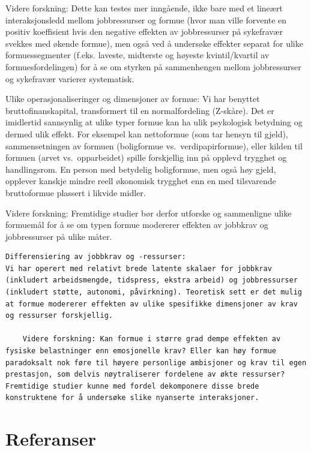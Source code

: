 \documentclass[
  12pt,
  a4paper,
  DIV=11,
  numbers=noendperiod]{scrartcl}
\begin{document}
Videre forskning: Dette kan testes mer inngående, ikke bare med et
lineært interaksjonsledd mellom jobbressurser og formue (hvor man ville
forvente en positiv koeffisient hvis den negative effekten av
jobbressurser på sykefravær svekkes med økende formue), men også ved å
undersøke effekter separat for ulike formuessegmenter (f.eks. laveste,
midterste og høyeste kvintil/kvartil av formuesfordelingen) for å se om
styrken på sammenhengen mellom jobbressurser og sykefravær varierer
systematisk.

Ulike operasjonaliseringer og dimensjoner av formue: Vi har benyttet
bruttofinanskapital, transformert til en normalfordeling (Z-skåre). Det
er imidlertid sannsynlig at ulike typer formue kan ha ulik psykologisk
betydning og dermed ulik effekt. For eksempel kan nettoformue (som tar
hensyn til gjeld), sammensetningen av formuen (boligformue
vs.~verdipapirformue), eller kilden til formuen (arvet vs.~opparbeidet)
spille forskjellig inn på opplevd trygghet og handlingsrom. En person
med betydelig boligformue, men også høy gjeld, opplever kanskje mindre
reell økonomisk trygghet enn en med tilsvarende bruttoformue plassert i
likvide midler.

Videre forskning: Fremtidige studier bør derfor utforske og sammenligne
ulike formuemål for å se om typen formue modererer effekten av jobbkrav
og jobbressurser på ulike måter.

\begin{verbatim}
Differensiering av jobbkrav og -ressurser:
Vi har operert med relativt brede latente skalaer for jobbkrav (inkludert arbeidsmengde, tidspress, ekstra arbeid) og jobbressurser (inkludert støtte, autonomi, påvirkning). Teoretisk sett er det mulig at formue modererer effekten av ulike spesifikke dimensjoner av krav og ressurser forskjellig.

    Videre forskning: Kan formue i større grad dempe effekten av fysiske belastninger enn emosjonelle krav? Eller kan høy formue paradoksalt nok føre til høyere personlige ambisjoner og krav til egen prestasjon, som delvis nøytraliserer fordelene av økte ressurser? Fremtidige studier kunne med fordel dekomponere disse brede konstruktene for å undersøke slike nyanserte interaksjoner.
\end{verbatim}

\newpage

\section*{Referanser}\label{referanser}
\end{document}

